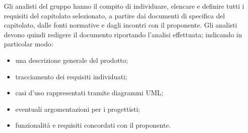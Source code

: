 Gli analisti del gruppo \Gruppo{} hanno il compito di individuare, elencare e definire tutti i requisiti del capitolato selezionato, a partire dai documenti di specifica del capitolato, dalle fonti normative e dagli incontri con il proponente. Gli analisti devono quindi redigere il documento \AdRv{} riportando l'analisi effettuata; indicando in particolar modo:

\begin{itemize}
    \item una descrizione generale del prodotto;
    \item tracciamento dei requisiti individuati;
    \item casi d'uso rappresentati tramite diagrammi UML;
    \item eventuali argomentazioni per i progettisti;
    \item funzionalit\`{a} e requisiti concordati con il proponente.
\end{itemize}
